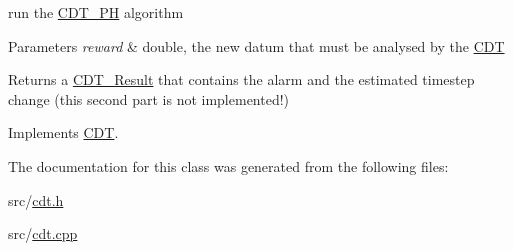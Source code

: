 run the \mbox{\hyperlink{class_c_d_t___p_h}{C\+D\+T\+\_\+\+PH}} algorithm 


\begin{DoxyParams}{Parameters}
{\em reward} & double, the new datum that must be analysed by the \mbox{\hyperlink{class_c_d_t}{C\+DT}} \\
\hline
\end{DoxyParams}
\begin{DoxyReturn}{Returns}
a \mbox{\hyperlink{class_c_d_t___result}{C\+D\+T\+\_\+\+Result}} that contains the alarm and the estimated timestep change (this second part is not implemented!) 
\end{DoxyReturn}


Implements \mbox{\hyperlink{class_c_d_t_a2493aeb166403f448ec689d2f7b85dbc}{C\+DT}}.



The documentation for this class was generated from the following files\+:\begin{DoxyCompactItemize}
\item 
src/\mbox{\hyperlink{cdt_8h}{cdt.\+h}}\item 
src/\mbox{\hyperlink{cdt_8cpp}{cdt.\+cpp}}\end{DoxyCompactItemize}
